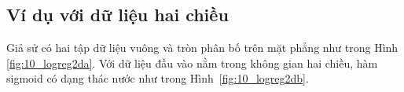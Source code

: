 
 
 
 
 

 
 
\subsection{Ví dụ với dữ liệu hai chiều}
Giả sử có hai tập dữ liệu vuông và tròn phân bố trên mặt phẳng như trong Hình \ref{fig:10_logreg2da}. Với dữ liệu đầu vào nằm trong không gian hai chiều, hàm sigmoid có dạng thác nước như trong Hình~\ref{fig:10_logreg2db}.

